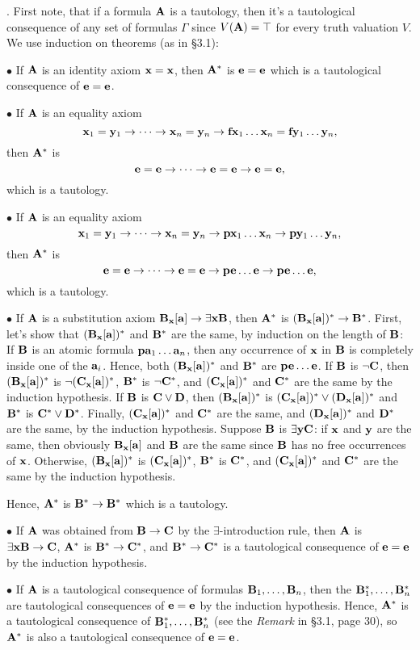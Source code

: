 . First note, that if a formula ${\bf A}$ is a tautology, then it's a tautological 
consequence of any set of formulas $\Gamma$ since $V({\bf A}) = \top$ for every truth 
valuation $V$. We use induction on theorems (as in \S3.1):
\item{$\bullet$} If ${\bf A}$ is an identity axiom ${\bf x} = {\bf x}$, then ${\bf A}^*$ is ${\bf e} = {\bf e}$ 
which is a tautological consequence of ${\bf e} = {\bf e}$.
\item{$\bullet$} If ${\bf A}$ is an equality axiom 
$${\bf x}_1 = {\bf y}_1 \to \cdots \to {\bf x}_n = {\bf y}_n \to {\bf f}{\bf x}_1 \dots {\bf x}_n = {\bf f}{\bf y}_1 \dots {\bf y}_n,$$
then ${\bf A}^*$ is 
$${\bf e} = {\bf e} \to \cdots \to {\bf e} = {\bf e} \to {\bf e} = {\bf e},$$
which is a tautology.
\item{$\bullet$} If ${\bf A}$ is an equality axiom 
$${\bf x}_1 = {\bf y}_1 \to \cdots \to {\bf x}_n = {\bf y}_n \to {\bf p}{\bf x}_1 \dots {\bf x}_n \to {\bf p}{\bf y}_1 \dots {\bf y}_n,$$
then ${\bf A}^*$ is 
$${\bf e} = {\bf e} \to \cdots \to {\bf e} = {\bf e} \to {\bf p}{\bf e} \dots {\bf e} \to {\bf p}{\bf e} \dots {\bf e},$$
which is a tautology.
\item{$\bullet$} If ${\bf A}$ is a substitution axiom ${\bf B}_{\bf x}[{\bf a}] \to \exists{\bf x}{\bf B}$, then 
${\bf A}^*$ is $({\bf B}_{\bf x}[{\bf a}])^* \to {\bf B}^*$. First, let's show that $({\bf B}_{\bf x}[{\bf a}])^*$ and ${\bf B}^*$ 
are the same, by induction on the length of ${\bf B}$:
\itemitem{$\circ$} If ${\bf B}$ is an atomic formula ${\bf p}{\bf a}_1 \dots {\bf a}_n$, then any occurrence 
of ${\bf x}$ in ${\bf B}$ is completely inside one of the ${\bf a}_i$. Hence, both $({\bf B}_{\bf x}[{\bf a}])^*$ and 
${\bf B}^*$ are ${\bf p}{\bf e} \dots {\bf e}$.
\itemitem{$\circ$} If ${\bf B}$ is $\neg {\bf C}$, then $({\bf B}_{\bf x}[{\bf a}])^*$ is $\neg ({\bf C}_{\bf x}[{\bf a}])^*$,
${\bf B}^*$ is $\neg {\bf C}^*$, and $({\bf C}_{\bf x}[{\bf a}])^*$ and ${\bf C}^*$ are the same by the induction 
hypothesis.
\itemitem{$\circ$} If ${\bf B}$ is ${\bf C} \lor {\bf D}$, then $({\bf B}_{\bf x}[{\bf a}])^*$ is $({\bf C}_{\bf x}[{\bf a}])^* \lor ({\bf D}_{\bf x}[{\bf a}])^*$
and ${\bf B}^*$ is ${\bf C}^* \lor {\bf D}^*$. Finally, $({\bf C}_{\bf x}[{\bf a}])^*$ and ${\bf C}^*$ are the same, and
$({\bf D}_{\bf x}[{\bf a}])^*$ and ${\bf D}^*$ are the same, by the induction hypothesis.
\itemitem{$\circ$} Suppose ${\bf B}$ is $\exists{\bf y}{\bf C}$: if ${\bf x}$ and ${\bf y}$ are the same, then
obviously ${\bf B}_{\bf x}[{\bf a}]$ and ${\bf B}$ are the same since ${\bf B}$ has no free occurrences of ${\bf x}$.
Otherwise, $({\bf B}_{\bf x}[{\bf a}])^*$ is $({\bf C}_{\bf x}[{\bf a}])^*$, ${\bf B}^*$ is ${\bf C}^*$, and $({\bf C}_{\bf x}[{\bf a}])^*$ and
${\bf C}^*$ are the same by the induction hypothesis.

Hence, ${\bf A}^*$ is ${\bf B}^* \to {\bf B}^*$ which is a tautology.
\item{$\bullet$} If ${\bf A}$ was obtained from ${\bf B} \to {\bf C}$ by the $\exists$-introduction rule,
then ${\bf A}$ is $\exists{\bf x}{\bf B} \to {\bf C}$, ${\bf A}^*$ is ${\bf B}^* \to {\bf C}^*$, and ${\bf B}^* \to {\bf C}^*$ is 
a tautological consequence of ${\bf e} = {\bf e}$ by the induction hypothesis.
\item{$\bullet$} If ${\bf A}$ is a tautological consequence of formulas ${\bf B}_1, \dots, {\bf B}_n$, 
then the ${\bf B}_1^*, \dots, {\bf B}_n^*$ are tautological consequences of ${\bf e}={\bf e}$ by the
induction hypothesis. Hence, ${\bf A}^*$ is a tautological consequence of 
${\bf B}_1^*, \dots, {\bf B}_n^*$ (see the {\it Remark} in \S3.1, page 30), so ${\bf A}^*$ is also
a tautological consequence of ${\bf e} = {\bf e}$.

